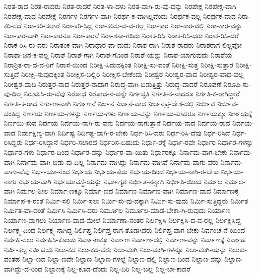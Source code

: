 {ನಿರತ-ರಾದ
ನಿರತ-ರಾದರು
ನಿರತ-ರಾದರೆ
ನಿರತ-ಳಾ-ದಳು
ನಿರತ-ವಾಗಿ-ರು-ವು-ದನ್ನು
ನಿರಪೇಕ್ಷ
ನಿರಪೇಕ್ಷ-ವಾಗಿ
ನಿರಪೇಕ್ಷ-ವಾದ
ನಿರಪೇಕ್ಷೆ
ನಿರರ್ಗಳ
ನಿರರ್ಗಳ-ವಾಗಿ
ನಿರರ್ಥ-ಕ-ವಾಗಿಲ್ಲವೆಂದು
ನಿರರ್ಥಕ-ವಲ್ಲ
ನಿರರ್ಥಕ-ವಾದ
ನಿರಾ-ಕರಿ-ಸದೆ
ನಿರಾ-ಕರಿ-ಸಲಾರೆ
ನಿರಾ-ಕರಿ-ಸಿದ್ದ
ನಿರಾ-ಕರಿಸು-ವ-ವ-ರಲ್ಲ
ನಿರಾ-ಕಾರ
ನಿರಾ-ಕಾರ-ದಲ್ಲಿ
ನಿರಾ-ಕಾರ-ವನ್ನು
ನಿರಾ-ಕಾರ-ವಾಗಿ
ನಿರಾ-ಕಾರನೂ
ನಿರಾ-ಕಾರನೆ
ನಿರಾ-ಶನಾ-ಗದಿರು
ನಿರಾಕ-ರಿಸಿ
ನಿರಾಕ-ರಿಸಿ-ದರು
ನಿರಾಕ-ರಿಸಿ-ದರೆ
ನಿರಾಕ-ರಿಸಿ-ರು-ವರು
ನಿರಾತಂಕ-ವಾಗಿ
ನಿರಾಧಾರ-ವಾ-ದುದು
ನಿರಾಶ-ರಾಗಿ
ನಿರಾಶ-ರಾದರು
ನಿರಾಶರಾಗ-ಲಿಲ್ಲವೋ
ನಿರಾಶಾ-ಜನ-ಕ-ವಲ್ಲ
ನಿರಾಶೆ
ನಿರಾಶೆ-ಗಾಗಿ
ನಿರಾಶೆ-ಗೊಂಡ
ನಿರಾಶೆ-ಯನ್ನು
ನಿರಾಶೆ-ಯಾಗುವುದು
ನಿರಾಶೆಯ
ನಿರಾಶ್ರಿತ-ರಾ-ದ-ವ-ರಿಗೆ
ನಿರಾಸೆ-ಯಿಂದ
ನಿರೀಕ್ಷಿ-ಸಿದುದಕ್ಕಿಂತ
ನಿರೀಕ್ಷಿ-ಸು-ವಂತೆ
ನಿರೀಕ್ಷಿ-ಸುತ್ತ
ನಿರೀಕ್ಷಿ-ಸುತ್ತಾರೆ
ನಿರೀಕ್ಷಿ-ಸುತ್ತಿದೆ
ನಿರೀಕ್ಷಿ-ಸುವುದಕ್ಕಿಂತ
ನಿರೀಕ್ಷಿಸ-ಬಲ್ಲಿರಿ
ನಿರೀಕ್ಷಿಸ-ಬೇಕೆಂದು
ನಿರೀಶ್ವರ
ನಿರೀಶ್ವರ-ವಾದ
ನಿರೀಶ್ವರ-ವಾದ-ವಲ್ಲ
ನಿರೀಶ್ವರ-ವಾದಿ
ನಿರುತ್ತರ-ನಾದ
ನಿರುತ್ತರ-ನಾದಾಗ
ನಿರುದ್ಧ-ವಾಗಿ-ಬಿಡುತ್ತಿತ್ತು
ನಿರುದ್ಧ-ವಾದರೆ
ನಿರೂಪಣೆ
ನಿರೂಪಿ-ಸು-ವು-ದಿಲ್ಲ
ನಿರೂಪಿಸಿ-ರು-ವೆವು
ನಿರೋಧ
ನಿರೋಧ-ನ-ವನ್ನೇ
ನಿರ್ಗಚ್ಛತಿ
ನಿರ್ಗತಿ-ಕ-ನಾದರೂ
ನಿರ್ಗತಿ-ಕ-ರಾಗಿದ್ದಾರೆ
ನಿರ್ಗತಿ-ಕ-ರಾದ
ನಿರ್ಗುಣ-ವಾಗಿ
ನಿರ್ಗುಣನೆ
ನಿರ್ಜನ
ನಿರ್ಜನ-ವಾದ
ನಿರ್ಜನಪ್ರ-ದೇಶ-ದಲ್ಲಿ
ನಿರ್ಜೀವ
ನಿರ್ಜೀವ-ದಂತಿದ್ದ
ನಿರ್ಣಯ
ನಿರ್ಣಯ-ಗಳನ್ನು
ನಿರ್ಣಯ-ಗಳು
ನಿರ್ಣಯ-ವನ್ನು
ನಿರ್ಣಯ-ವಾದರೂ
ನಿರ್ಣಯಕ್ಕೂ
ನಿರ್ಣಯಕ್ಕೆ
ನಿರ್ಣಯಿ-ಸುವ
ನಿರ್ದಯ
ನಿರ್ದಯ-ನಾಗಿ-ರು-ವನು
ನಿರ್ದಯ-ನಾಗುತ್ತಾನೆ
ನಿರ್ದಯ-ನಾದ
ನಿರ್ದಯ-ರಾದ
ನಿರ್ದಯ-ವಾದ
ನಿರ್ದಾಕ್ಷಿಣ್ಯ-ವಾಗಿ
ನಿರ್ದಿಷ್ಟ
ನಿರ್ದಿಷ್ಟ-ವಾಗಿ-ರ-ಬೇಕು
ನಿರ್ಧ-ರಿಸಿ-ದರು
ನಿರ್ಧ-ರಿಸಿ-ದೆವು
ನಿರ್ಧ-ರಿಸಿದೆ
ನಿರ್ಧ-ರಿಸಿದ್ದರು
ನಿರ್ಧ-ರಿಸಿದ್ದಾನೆ
ನಿರ್ಧರಿ-ಸಲಾರದ
ನಿರ್ಧರಿಸ-ಬಹುದು
ನಿರ್ಧಾ-ರಕ್ಕೆ
ನಿರ್ಧಾ-ರವೇ
ನಿರ್ಧಾರ
ನಿರ್ಧಾರ-ಗಳನ್ನು
ನಿರ್ಧಾರ-ಗಳು
ನಿರ್ಧಾರ-ದಿಂದ
ನಿರ್ಧಾರ-ವನ್ನು
ನಿರ್ಧಾರ-ವಾ-ಯಿತು
ನಿರ್ಧಾರಕ್ಕೂ
ನಿರ್ನಾಮ-ವಾಗ-ಬೇಕು
ನಿರ್ನಾಮ-ವಾಗಿ
ನಿರ್ನಾಮ-ವಾಗಿ-ಬಿಡು-ವು-ದಿಲ್ಲ
ನಿರ್ನಾಮ-ವಾಗಿದ್ದು
ನಿರ್ನಾಮ-ವಾಗಿವೆ
ನಿರ್ನಾಮ-ವಾಗು-ವರು
ನಿರ್ನಾಮ-ವಾಗು-ವೆವು
ನಿರ್ಭ-ಯಾ-ನಂದ
ನಿರ್ಭಯ
ನಿರ್ಭಯ-ತೆಯ
ನಿರ್ಭಯ-ದಿಂದ
ನಿರ್ಭಯ-ನಾಗಿ-ರ-ಬೇಕು
ನಿರ್ಭಯ-ನಾಗು
ನಿರ್ಭಯ-ವಾಗಿ
ನಿರ್ಭಯಾವಸ್ಥೆ-ಯನ್ನು
ನಿರ್ಭಾಗ್ಯರ
ನಿರ್ಭೀತ-ನನ್ನಾಗಿ
ನಿರ್ಭೀತಿ-ಯಿಂದ
ನಿರ್ಮಲ
ನಿರ್ಮಲ-ವಾಗಿ
ನಿರ್ಮಲ-ಶೀಲ
ನಿರ್ಮಾ-ಣಕ್ಕೂ
ನಿರ್ಮಾ-ಣದ
ನಿರ್ಮಾಣ
ನಿರ್ಮಾಣ-ವಾಗಿ
ನಿರ್ಮಾಣ-ವಾದ
ನಿರ್ಮಾಣಕ್ಕೆ
ನಿರ್ಮಾಪ-ಕ-ರಂತೆ
ನಿರ್ಮಿ-ಸಲಿ
ನಿರ್ಮಿ-ಸಲು
ನಿರ್ಮಿ-ಸು-ವು-ದಕ್ಕಾಗಿ
ನಿರ್ಮಿ-ಸು-ವುದು
ನಿರ್ಮಿ-ಸುತ್ತಿದ್ದರು
ನಿರ್ಮಿತ
ನಿರ್ಮಿತ-ವಾ-ದಂತೆ
ನಿರ್ಮಿಸಿ
ನಿರ್ಮಿಸಿ-ದರು
ನಿರ್ಮೂಲ
ನಿರ್ಮೂಲ-ಮಾಡ-ಬೇಕಾ-ಗಿ-ರುವುದು
ನಿರ್ಯಾಣ
ನಿರ್ಯಾಣ-ವಾಗಲು
ನಿರ್ಯಾಣ-ವಾದ-ಮೇಲೆ
ನಿರ್ಯಾಣಾ-ನಂತರ
ನಿರ್ಲಕ್ಷಿಸಿ
ನಿರ್ಲಕ್ಷಿಸಿ-ದ-ವ-ರಲ್ಲ
ನಿರ್ಲಕ್ಷಿಸಿದ್ದ
ನಿರ್ಲಕ್ಷ್ಯ-ದಿಂದ
ನಿರ್ಲಕ್ಷ್ಯ-ನಾಗಿದ್ದ
ನಿರ್ಲಿಪ್ತ
ನಿರ್ಲಿಪ್ತ-ರಾಗ-ತೊಡಗಿದರು
ನಿರ್ಲಿಪ್ತ-ವಾಗ-ಬೇಕು
ನಿರ್ವಂಚ-ನೆ-ಯಿಂದ
ನಿರ್ವಹಿ-ಸಲು
ನಿರ್ವಹಿಸಿ-ಕೊಂಡು
ನಿರ್ವಾ-ಣಕ್ಕೂ
ನಿರ್ವಾಣ
ನಿರ್ವಾಣ-ದಲ್ಲಿ
ನಿರ್ವಾಣ-ವನ್ನು
ನಿರ್ವಾಣಕ್ಕೆ
ನಿರ್ವಾಹ
ನಿರ್ವಿ-ಕಲ್ಪ
ನಿರ್ವಿಷಯ
ನಿಲು-ಕದ
ನಿಲು-ಕದ-ವರು
ನಿಲು-ವಂಗಿ
ನಿಲು-ವಂಗಿ-ಗಳನ್ನೂ
ನಿಲು-ವಂಗಿ-ಯನ್ನು
ನಿಲುಕು-ವಂತಹ
ನಿಲ್ದಾ-ಣದ
ನಿಲ್ದಾ-ಣವೇ
ನಿಲ್ದಾಣ
ನಿಲ್ದಾಣ-ಗಳಲ್ಲೆ
ನಿಲ್ದಾಣ-ದಲ್ಲಿ
ನಿಲ್ದಾಣ-ದಿಂದ
ನಿಲ್ದಾಣ-ವನ್ನು
ನಿಲ್ದಾಣ-ವಾಗಿದ್ದು-ದ-ರಿಂದ
ನಿಲ್ದಾಣಕ್ಕೆ
ನಿಲ್ಲ-ಕೂಡ-ದೆಂದು
ನಿಲ್ಲ-ದಿರಿ
ನಿಲ್ಲ-ಬಲ್ಲ
ನಿಲ್ಲ-ಬೇ-ಕಾದರೆ
}
